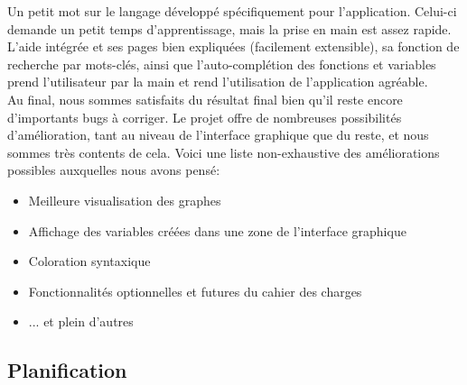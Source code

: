 \documentclass[french]{article}
\begin{document}
			Un petit mot sur le langage développé spécifiquement pour l'application. Celui-ci demande un petit temps d'apprentissage, mais la prise en main est assez rapide. L'aide intégrée et ses pages bien expliquées (facilement extensible), sa fonction de recherche par mots-clés, ainsi que l'auto-complétion des fonctions et variables prend l'utilisateur par la main et rend l'utilisation de l'application agréable.\\  
			
			Au final, nous sommes satisfaits du résultat final bien qu'il reste encore d'importants bugs à corriger. Le projet offre de nombreuses possibilités d'amélioration, tant au niveau de l'interface graphique que du reste, et nous sommes très contents de cela. Voici une liste non-exhaustive des améliorations possibles auxquelles nous avons pensé:
			\begin{itemize}
				\item Meilleure visualisation des graphes
				\item Affichage des variables créées dans une zone de l'interface graphique
				\item Coloration syntaxique
				\item Fonctionnalités optionnelles et futures du cahier des charges
				\item ... et plein d'autres
			\end{itemize}
		
		\subsection{Planification}
			
\end{document}
